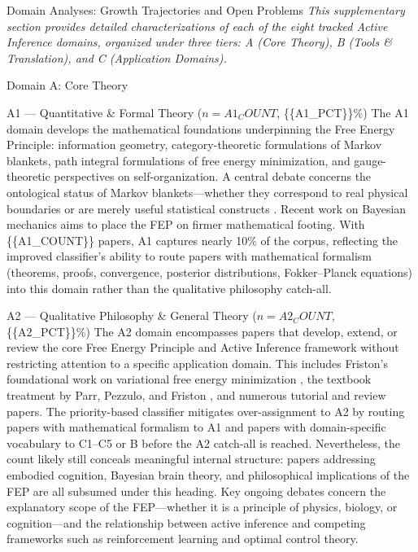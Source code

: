 \documentclass[
  ignorenonframetext,
]{beamer}
\author{\texorpdfstring{}{}}
\date{}
\begin{document}
\begin{frame}{Domain Analyses: Growth Trajectories and Open Problems
\label{sec:subfield_analyses}}
\protect{}\label{domain-analyses-growth-trajectories-and-open-problems}
\emph{This supplementary section provides detailed characterizations of
each of the eight tracked Active Inference domains, organized under
three tiers: A (Core Theory), B (Tools \& Translation), and C
(Application Domains).}

\begin{block}{Domain A: Core Theory}
\protect{}\label{domain-a-core-theory}
\begin{block}{A1 --- Quantitative \& Formal Theory
(\(n = {{A1_COUNT}}\), \{\{A1\_PCT\}\}\%)}
\protect{}\label{a1-quantitative-formal-theory-n-a1_count-a1_pct}
The A1 domain develops the mathematical foundations underpinning the
Free Energy Principle: information geometry, category-theoretic
formulations of Markov blankets, path integral formulations of free
energy minimization, and gauge-theoretic perspectives on
self-organization. A central debate concerns the ontological status of
Markov blankets---whether they correspond to real physical boundaries or
are merely useful statistical constructs \citep{bruineberg2022emperor}.
Recent work on Bayesian mechanics \citep{sakthivadivel2023bayesian} aims
to place the FEP on firmer mathematical footing. With \{\{A1\_COUNT\}\}
papers, A1 captures nearly 10\% of the corpus, reflecting the improved
classifier's ability to route papers with mathematical formalism
(theorems, proofs, convergence, posterior distributions, Fokker--Planck
equations) into this domain rather than the qualitative philosophy
catch-all.
\end{block}

\begin{block}{A2 --- Qualitative Philosophy \& General Theory
(\(n = {{A2_COUNT}}\), \{\{A2\_PCT\}\}\%)}
\protect{}\label{a2-qualitative-philosophy-general-theory-n-a2_count-a2_pct}
The A2 domain encompasses papers that develop, extend, or review the
core Free Energy Principle and Active Inference framework without
restricting attention to a specific application domain. This includes
Friston's foundational work on variational free energy minimization
\citep{friston2010free}, the textbook treatment by Parr, Pezzulo, and
Friston \citep{parr2022active}, and numerous tutorial and review papers.
The priority-based classifier mitigates over-assignment to A2 by routing
papers with mathematical formalism to A1 and papers with domain-specific
vocabulary to C1--C5 or B before the A2 catch-all is reached.
Nevertheless, the count likely still conceals meaningful internal
structure: papers addressing embodied cognition, Bayesian brain theory,
and philosophical implications of the FEP are all subsumed under this
heading. Key ongoing debates concern the explanatory scope of the
FEP---whether it is a principle of physics, biology, or cognition---and
the relationship between active inference and competing frameworks such
as reinforcement learning and optimal control theory.
\end{block}
\end{block}


\end{frame}
\end{document}
